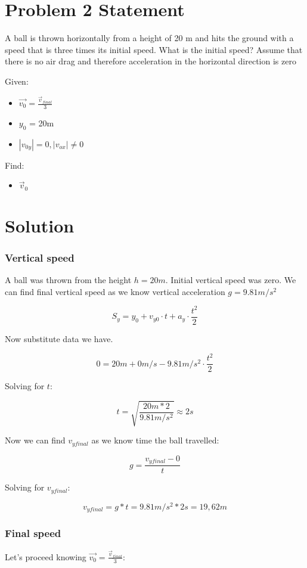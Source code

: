 \section*{Problem 2 Statement}

A ball is thrown horizontally from a height of 20 m and hits the ground with a speed that is three
times its initial speed. What is the initial speed? Assume that there is no air drag and therefore
acceleration in the horizontal direction is zero 

\bigbreak Given:
\begin{itemize}
    \item $\vec{v_0} = \frac{\vec{v}_{final}}{3}$
    \item $y_0$ = 20m
    \item $|v_{0y}| = 0, |v_{ox}| \neq 0$
\end{itemize}

Find:
\begin{itemize}
    \item $\vec{v}_{0}$
\end{itemize}

\section*{Solution}
\subsubsection*{Vertical speed}

A ball was thrown from the height $h = 20m$. Initial vertical speed was zero.
We can find final vertical speed as we know vertical acceleration $g = 9.81m/s^2$

$$ S_y = y_0 + v_{y0} \cdot t + a_y \cdot \frac{t^2}{2}$$

Now substitute data we have.

$$ 0 = 20m + 0m/s - 9.81m/s^2 \cdot \frac{t^2}{2}$$

Solving for $t$:

$$t = \sqrt{\frac{20m * 2}{9.81m/s^2}} \approx 2s$$

Now we can find $v_{yfinal}$ as we know time the ball travelled:

$$ g = \frac{v_{yfinal} - 0}{t}$$

Solving for $v_{yfinal}$:

$$v_{yfinal} = g * t = 9.81m/s^2 * 2s = 19,62m$$

\subsubsection*{Final speed}
Let's proceed knowing $\vec{v_0} = \frac{\vec{v}_{final}}{3}$:

